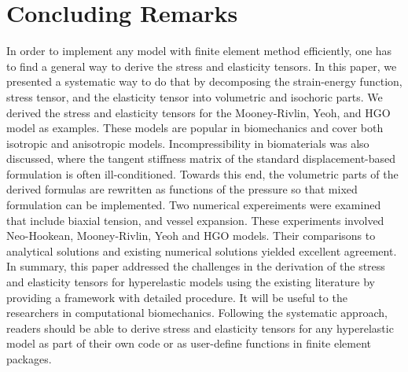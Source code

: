 \section{Concluding Remarks}
\label{conclusions}
In order to implement any model with finite element method efficiently, one has to find a general way to derive the stress and elasticity tensors. In this paper, we presented a systematic way to do that by decomposing the strain-energy function, stress tensor, and the elasticity tensor into volumetric and isochoric parts. We derived the stress and elasticity tensors for the Mooney-Rivlin, Yeoh, and HGO model as examples. These models are popular in biomechanics and cover both isotropic and anisotropic models. Incompressibility in biomaterials was also discussed, where the tangent stiffness matrix of the standard displacement-based formulation is often ill-conditioned. Towards this end, the volumetric parts of the derived formulas are rewritten as functions of the pressure so that mixed formulation can be implemented. Two numerical expereiments were examined that include biaxial tension, and vessel expansion. These experiments involved Neo-Hookean, Mooney-Rivlin, Yeoh and HGO models. Their comparisons to analytical solutions and existing numerical solutions yielded excellent agreement. In summary, this paper addressed the challenges in the derivation of the stress and elasticity tensors for hyperelastic models using the existing literature by providing a framework with detailed procedure. It will be useful to the researchers in computational biomechanics. Following the systematic approach, readers should be able to derive stress and elasticity tensors for any hyperelastic model as part of their own code or as user-define functions in finite element packages.
